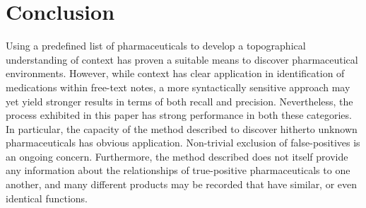 


\section{Conclusion}Using a predefined list of pharmaceuticals to develop a topographical understanding of context has proven a suitable means to discover pharmaceutical environments. However, while context has clear application in identification of medications within free-text notes, a more syntactically sensitive approach may yet yield stronger results in terms of both recall and precision. Nevertheless, the process exhibited in this paper has strong performance in both these categories. In particular, the capacity of the method described to discover hitherto unknown pharmaceuticals has obvious application. Non-trivial exclusion of false-positives is an ongoing concern. Furthermore, the method described does not itself provide any information about the relationships of true-positive pharmaceuticals to one another, and many different products may be recorded that have similar, or even identical functions.     

